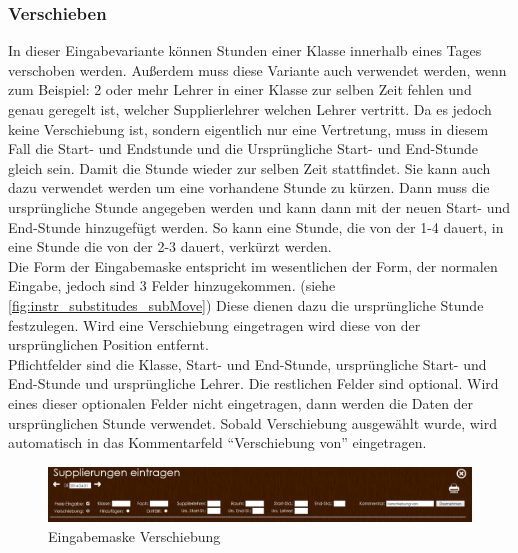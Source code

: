 \subsubsection{Verschieben}\label{sec:instr_admin_sub_move}
In dieser Eingabevariante können Stunden einer Klasse innerhalb eines Tages verschoben werden. Außerdem muss diese Variante auch verwendet werden, wenn zum Beispiel: 2 oder mehr Lehrer in einer Klasse zur selben Zeit fehlen und genau geregelt ist, welcher Supplierlehrer welchen Lehrer vertritt. Da es jedoch keine Verschiebung ist, sondern eigentlich nur eine Vertretung, muss in diesem Fall die Start- und Endstunde und die Ursprüngliche Start- und End-Stunde gleich sein. Damit die Stunde wieder zur selben Zeit stattfindet. Sie kann auch dazu verwendet werden um eine vorhandene Stunde zu kürzen. Dann muss die ursprüngliche Stunde angegeben werden und kann dann mit der neuen Start- und End-Stunde hinzugefügt werden. So kann eine Stunde, die von der 1-4 dauert, in eine Stunde die von der 2-3 dauert, verkürzt werden.\\
Die Form der Eingabemaske entspricht im wesentlichen der Form, der normalen Eingabe, jedoch sind 3 Felder hinzugekommen. (siehe \autoref{fig:instr_substitudes_subMove}) Diese dienen dazu die ursprüngliche Stunde festzulegen. Wird eine Verschiebung eingetragen wird diese von der ursprünglichen Position entfernt.\\
Pflichtfelder sind die Klasse, Start- und End-Stunde, ursprüngliche Start- und End-Stunde und ursprüngliche Lehrer. Die restlichen Felder sind optional. Wird eines dieser optionalen Felder nicht eingetragen, dann werden die Daten der ursprünglichen Stunde verwendet. Sobald Verschiebung ausgewählt wurde, wird automatisch in das Kommentarfeld \enquote{Verschiebung von} eingetragen.
\begin{figure}[H]
\centering
\includegraphics[keepaspectratio=true, width=17cm]{images/screenshots/substitudes_move.png}
\caption{Eingabemaske Verschiebung}
\label{fig:instr_substitudes_subMove}
\end{figure}
